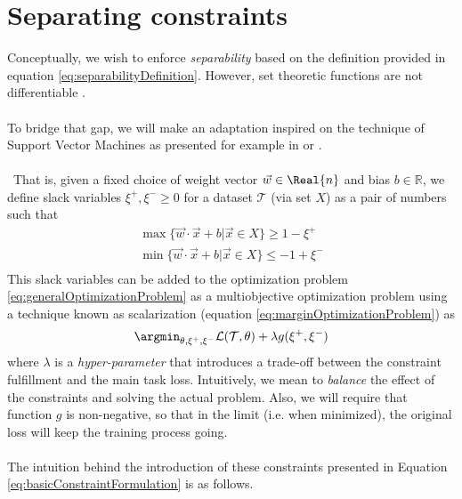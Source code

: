 \section{Separating constraints}\label{sec:constraint}
Conceptually, we wish to enforce \ReLU \emph{separability} based on the definition provided in equation \ref{eq:separabilityDefinition}. However, set theoretic functions are not differentiable \cite{Glorot10Initialization,lecun2015DeepLearningBig,munkres2000Topology}. 
\\\\
To bridge that gap, we will make an adaptation inspired on the technique of Support Vector Machines as presented for example in  \cite{Burges1998TutorialOnSVMForPatternRecognition} or \cite{Hearst1998SupportVectorMachines}. 
\\\\\
That is, given a fixed choice of weight vector  $\vec{w}\in\Real{n}$ and bias $b\in\mathbb{R}$, we define slack variables $\xi^{+},\xi^{-}\geq 0$ for a dataset $\mathcal{T}$ (via set $X$) as a pair of numbers such that
\begin{equation}\label{eq:basicConstraintFormulation}
\begin{array}{lcl}
    \max\{\vec{w}\cdot\vec{x}+b|\vec{x}\in X\}\geq 1-\xi^{+}\\
    \min\{\vec{w}\cdot\vec{x}+b|\vec{x}\in X\}\leq -1+\xi^{-}\\
\end{array}
\end{equation}
This slack variables can be added to the optimization problem \ref{eq:generalOptimizationProblem} as a multiobjective optimization problem using a technique known as scalarization \cite{boyd} (equation \ref{eq:marginOptimizationProblem}) as
\begin{equation}\label{eq:marginOptimizationProblem}
\argmin_{\theta,\xi^{+},\xi^{-}} \mathcal{L}(\mathcal{T},\theta) + \lambda g(\xi^{+},\xi^{-})
\end{equation}
where $\lambda$ is a \emph{hyper-parameter} that introduces a trade-off between the constraint fulfillment and the main task loss. Intuitively, we mean to \emph{balance} the effect of the constraints and solving the actual problem.
Also, we will require that function $g$ is non-negative, so that in the limit (i.e. when minimized), the original loss will keep the training process going. 
\\\\
The intuition behind the introduction of these constraints presented in Equation \ref{eq:basicConstraintFormulation} is as follows. 
